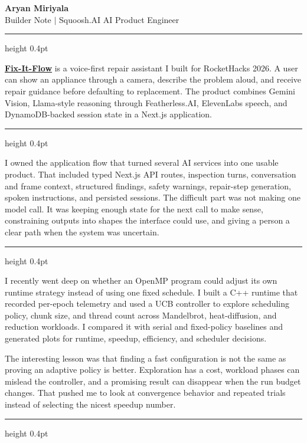 \documentclass[letterpaper,11pt]{article}
\newcommand{\notesection}[1]{%
  \vspace{2pt}{\large\scshape #1}\par\vspace{1pt}%
  \hrule height 0.4pt\vspace{3pt}%
}
\begin{document}
\begin{center}
  {\LARGE\textbf{Aryan Miriyala}}\\[-1pt]
  \small Builder Note $|$ Squoosh.AI AI Product Engineer
\end{center}\vspace{-6pt}

\notesection{One thing I built}

\href{https://github.com/aryanmiriyala/rockethacks-2026}{\textbf{Fix-It-Flow}} is a voice-first repair assistant I built for RocketHacks 2026. A user can show an appliance through a camera, describe the problem aloud, and receive repair guidance before defaulting to replacement. The product combines Gemini Vision, Llama-style reasoning through Featherless.AI, ElevenLabs speech, and DynamoDB-backed session state in a Next.js application.

\notesection{What I owned}

I owned the application flow that turned several AI services into one usable product. That included typed Next.js API routes, inspection turns, conversation and frame context, structured findings, safety warnings, repair-step generation, spoken instructions, and persisted sessions. The difficult part was not making one model call. It was keeping enough state for the next call to make sense, constraining outputs into shapes the interface could use, and giving a person a clear path when the system was uncertain.

\notesection{A recent technical rabbit hole}

I recently went deep on whether an OpenMP program could adjust its own runtime strategy instead of using one fixed schedule. I built a C++ runtime that recorded per-epoch telemetry and used a UCB controller to explore scheduling policy, chunk size, and thread count across Mandelbrot, heat-diffusion, and reduction workloads. I compared it with serial and fixed-policy baselines and generated plots for runtime, speedup, efficiency, and scheduler decisions.

The interesting lesson was that finding a fast configuration is not the same as proving an adaptive policy is better. Exploration has a cost, workload phases can mislead the controller, and a promising result can disappear when the run budget changes. That pushed me to look at convergence behavior and repeated trials instead of selecting the nicest speedup number.

\notesection{How I would sanity-check an AI result}
\end{document}
